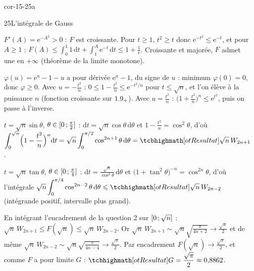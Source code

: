 
\begin{blocLivre}{cor-15-25a}
\begin{corrige}{25}{L'intégrale de Gauss}
\begin{questions}
  \item $F'(A)=\mathrm{e}^{-A^{2}}>0$ : $F$ est croissante. Pour
    $t\geqslant1$, $t^{2}\geqslant t$ donc $\mathrm{e}^{-t^{2}}\leqslant\mathrm{e}^{-t}$,
    et pour $A\geqslant1$ :
    $F(A)\leqslant\int_0^{1}1\,\mathrm{d}t+\int_1^{A}\mathrm{e}^{-t}\,\mathrm{d}t
    \leqslant1+\frac1{\mathrm{e}}$. Croissante et majorée, $F$ admet une
     en $+\infty$ (théorème de la limite
    monotone).
  \item $\varphi(u)=\mathrm{e}^{u}-1-u$ a pour dérivée $\mathrm{e}^{u}-1$,
    du signe de $u$ : minimum $\varphi(0)=0$, donc $\varphi\geqslant0$.
    Avec $u=-\frac{t^{2}}{n}$ : $0\leqslant1-\frac{t^{2}}{n}\leqslant\mathrm{e}^{-t^{2}/n}$
    pour $t\leqslant\sqrt n$, et l'on élève à la puissance $n$ (fonction
    croissante sur $1.9_{+}$). Avec $u=\frac{t^{2}}{n}$ :
    $\bigl(1+\frac{t^{2}}{n}\bigr)^{n}\leqslant\mathrm{e}^{t^{2}}$, puis on
    passe à l'inverse.
\end{questions}
\begin{questions}[resume]
  \item $t=\sqrt n\sin\theta$, $\theta\in\mathopen{[}0\,{;}\,\frac\pi2\mathclose{]}$ :
    $\mathrm{d}t=\sqrt n\cos\theta\,\mathrm{d}\theta$ et
    $1-\frac{t^{2}}{n}=\cos^{2}\theta$, d'où
    $\displaystyle\int_0^{\sqrt n}\Bigl(1-\frac{t^{2}}{n}\Bigr)^{n}\mathrm{d}t
    =\sqrt n\int_0^{\pi/2}\cos^{2n+1}\theta\,\mathrm{d}\theta=\res{\sqrt n\,W_{2n+1}}$.
  \item $t=\sqrt n\tan\theta$, $\theta\in\mathopen{[}0\,{;}\,\frac\pi4\mathclose{]}$ :
    $\mathrm{d}t=\frac{\sqrt n}{\cos^{2}\theta}\,\mathrm{d}\theta$ et
    $\bigl(1+\tan^{2}\theta\bigr)^{-n}=\cos^{2n}\theta$, d'où l'intégrale
    $\sqrt n\displaystyle\int_0^{\pi/4}\cos^{2n-2}\theta\,\mathrm{d}\theta
    \leqslant\res{\sqrt n\,W_{2n-2}}$ (intégrande positif, intervalle plus
    grand).
  \item En intégrant l'encadrement de la question 2 sur
    $\mathopen{[}0\,{;}\,\sqrt n\mathclose{]}$ : $\sqrt n\,W_{2n+1}\leqslant F(\sqrt n)\leqslant\sqrt n\,W_{2n-2}$.
    Or
    $\sqrt n\,W_{2n+1}\sim\sqrt n\sqrt{\frac{\pi}{4n+2}}\to\frac{\sqrt\pi}{2}$
    et de même $\sqrt n\,W_{2n-2}\sim\sqrt n\sqrt{\frac{\pi}{4n-4}}\to\frac{\sqrt\pi}2$.
    Par encadrement $F(\sqrt n)\to\frac{\sqrt\pi}{2}$, et comme $F$ a pour
    limite $G$ : $\res{G=\dfrac{\sqrt\pi}{2}}\approx0{,}8862$.
\end{questions}
\end{corrige}
\end{blocLivre}

